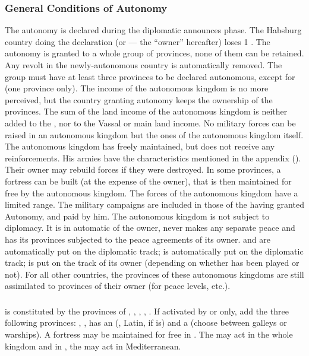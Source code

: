 \subsubsection{General Conditions of Autonomy}
\aparag The autonomy is declared during the diplomatic announces
phase. The Habsburg country doing the declaration (\SPA or \AUS --- the
``owner'' hereafter) loses 1 \STAB.
\aparag The autonomy is granted to a whole group of provinces, none of
them can be retained.
\bparag Any revolt in the newly-autonomous country is automatically
removed.
\bparag The group must have at least three provinces to be declared
autonomous, except for  (one province only).
\aparag The income of the autonomous kingdom is no more perceived, but
the country granting autonomy keeps the ownership of the provinces.
\bparag The sum of the land income of the autonomous kingdom is neither
added to the , nor to the Vassal or main land
income.
\aparag No military forces can be raised in an autonomous kingdom but
the ones of the autonomous kingdom itself.
\bparag The autonomous kingdom has  freely
maintained, but does not receive any reinforcements. His armies have the
characteristics mentioned in the appendix ().
\bparag Their owner may rebuild forces if they were destroyed.
\bparag In some provinces, a fortress can be built (at the expense of
the owner), that is then maintained for free by the autonomous kingdom.
\bparag The forces of the autonomous kingdom have a limited range.
\bparag The military campaigns are included in those of the \HAB having
granted Autonomy, and paid by him.
\aparag The autonomous kingdom is not subject to diplomacy. It is in
automatic \EW of the owner, never makes any separate peace and has its
provinces subjected to the peace agreements of its owner.
\bparag {} and  are automatically put on the
\AUS diplomatic track;  is automatically put on the \SPA
diplomatic track;  is put on the track of its owner
(depending on whether  has been played or
not).
\bparag For all other countries, the provinces of these autonomous
kingdoms are still assimilated to provinces of their owner (for peace
levels, etc.).


\subsubsection{}
\aparag {} is constituted by the provinces of
, , ,
, .  If activated by \AUS or \hab
only, add the three following provinces: ,
, 
\aparag {} has an \ARMY\facemoins (\CAIII, Latin, \TTER if
\SPA is) and a \FLEET\facemoins (choose between galleys or warships).
\bparag A fortress may be maintained for free in .
\bparag The \ARMY may act in the whole kingdom and in ,
the \FLEET may act in Mediterranean.


